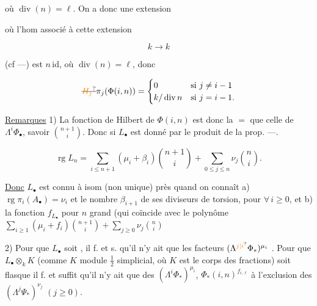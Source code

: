 
où $\operatorname{div}(n)=\ell$. On a donc une extension


où l'hom associé à cette extension

\[ k\longrightarrow k \]

(cf ---) est $n\,\mathrm{id}$, où $\operatorname{div}(n)=\ell$, donc

\[
\deleted{\unsure{H_j}}\pi_j(\Phi(i,n))=
\begin{cases}0&\text{si }j\ne i-1\\
k/\operatorname{div}n&\text{si }j=i-1.
\end{cases}
\]

\uline{Remarques} 1) La fonction de Hilbert de $\Phi(i,n)$ est donc la $=$ que celle de $\Lambda^i\Phi_{\bullet}$, savoir $\binom{n+1}{i}$. Donc si $L_{\bullet}$ est donné par le produit de la prop. ---.

\[
\operatorname{rg}L_n=\sum_{i\leq n+1}(\mu_i+\beta_i)\binom{n+1}{i}
+\sum_{0\leq j\leq n}\nu_j\binom{n}{i}.
\]

\uline{Donc}  $L_{\bullet}$  est  connu à isom (non unique) près quand on connaît a) $\operatorname{rg}\pi_i(A_{\bullet})=\nu_i$ et le nombre $\beta_{i+1}$ de ses diviseurs de torsion, pour $\forall\,i\geq0$, et b) la fonction $f_{L_{\bullet}}$  pour $n$ grand (qui coïncide  avec  le polynôme $\sum_{i\geq1}(\mu_i+f_i)\binom{n+1}{i}+\sum_{j\geq0}\nu_j\binom{n}{i}$


2) Pour que $L_{\bullet}$ soit  , il f. et s. qu'il n'y ait que les facteurs $(\Lambda^{\unsure{j|i}}\Phi_{\ast})^{\mu_i}$ . Pour que $L_{\bullet}\otimes_k K$ (comme $K$ module $\frac12$ simplicial, où $K$ est le corps des fractions) soit flasque il f. et suffit qu'il n'y ait que des $(\Lambda^i\Phi_{\ast})^{\mu_i}$, $\Phi_{\ast}(i,n)^{f_{i,\ell}}$  à l'exclusion des $(\Lambda^j\Psi_{\ast})^{\nu_j}$ $(j\geq0)$.

